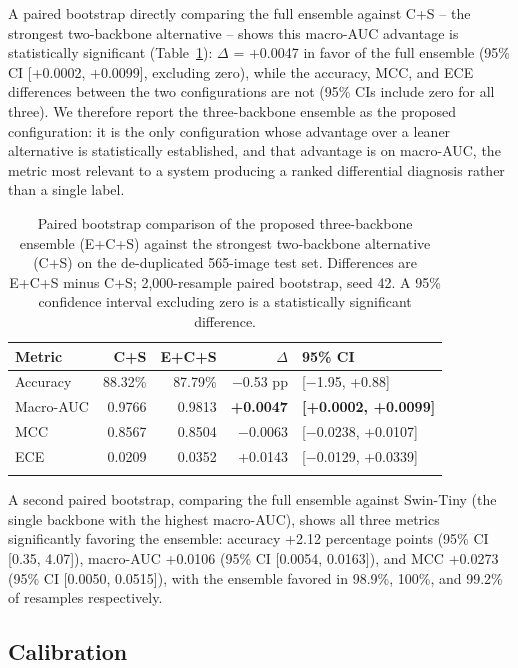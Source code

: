 \documentclass[VANCOUVER,twocolumn]{USG}
\begin{document}
A paired bootstrap directly comparing the full ensemble against C+S --
the strongest two-backbone alternative -- shows this macro-AUC advantage
is statistically significant (Table~\ref{tab:ecs-vs-cs}): $\Delta$ =
+0.0047 in favor of the full ensemble (95\% CI [+0.0002, +0.0099],
excluding zero), while the accuracy, MCC, and ECE differences between the
two configurations are not (95\% CIs include zero for all three). We
therefore report the three-backbone ensemble as the proposed
configuration: it is the only configuration whose advantage over a leaner
alternative is statistically established, and that advantage is on
macro-AUC, the metric most relevant to a system producing a ranked
differential diagnosis rather than a single label.

\begin{table}[htbp]
\caption{Paired bootstrap comparison of the proposed three-backbone
ensemble (E+C+S) against the strongest two-backbone alternative (C+S) on
the de-duplicated 565-image test set. Differences are E+C+S minus C+S;
2{,}000-resample paired bootstrap, seed 42. A 95\% confidence interval
excluding zero is a statistically significant difference.}\label{tab:ecs-vs-cs}
\begin{tabular}{@{}lrrrl@{}}
\toprule
Metric & C+S & E+C+S & $\Delta$ & 95\% CI \\
\midrule
Accuracy & 88.32\% & 87.79\% & $-$0.53 pp & [$-$1.95, +0.88] \\
Macro-AUC & 0.9766 & 0.9813 & \textbf{+0.0047} & \textbf{[+0.0002, +0.0099]} \\
MCC & 0.8567 & 0.8504 & $-$0.0063 & [$-$0.0238, +0.0107] \\
ECE & 0.0209 & 0.0352 & +0.0143 & [$-$0.0129, +0.0339] \\
\botrule
\end{tabular}
\end{table}

A second paired bootstrap, comparing the full ensemble against Swin-Tiny
(the single backbone with the highest macro-AUC), shows all three metrics
significantly favoring the ensemble: accuracy +2.12 percentage points
(95\% CI [0.35, 4.07]), macro-AUC +0.0106 (95\% CI [0.0054, 0.0163]), and
MCC +0.0273 (95\% CI [0.0050, 0.0515]), with the ensemble favored in
98.9\%, 100\%, and 99.2\% of resamples respectively.

\subsection{Calibration}
\end{document}

